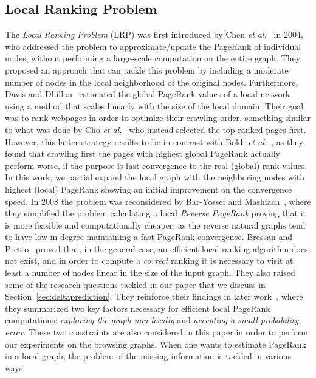 \documentclass{sig-alternate-2013}
\newcommand{\etal}{\emph{et al.}}
\begin{document}
\subsection*{Local Ranking Problem}
The \textit{Local Ranking Problem} (LRP) was first introduced by Chen \etal~\cite{Chen2004} in $2004$, who addressed the problem to approximate/update the PageRank of individual nodes, without performing a large-scale computation on the entire graph.
They proposed an approach that can tackle this problem by including a moderate
number of nodes in the local neighborhood of the original nodes. Furthermore,
Davis and Dhillon~\cite{DavisKDD06} estimated the global PageRank values of a
local network using a method that scales linearly with the size of the local
domain. Their goal was to rank  webpages in order to optimize their crawling
order, something similar to what was done by Cho \etal~\cite{Cho1998} who
instead selected the top-ranked pages first. However, this latter strategy results to be in contrast with Boldi \etal~\cite{BoldiWAW2004}, as they found that crawling first the pages with highest global PageRank actually perform worse, if the purpose is fast convergence to the real (global) rank values. In this work, we partial expand the local graph with the neighboring nodes with highest (local) PageRank showing an initial improvement on the convergence speed.
% 
In $2008$ the problem was reconsidered by Bar-Yossef and Mashiach~\cite{Bar-Yossef2008}, where they simplified the problem calculating a local {\it Reverse PageRank} proving that it is more feasible and computationally cheaper, as the reverse natural graphs tend to have low in-degree maintaining a fast PageRank convergence.
Bressan and Pretto~\cite{Bressan2011} proved that, in the general case, an efficient local ranking algorithm does not exist, and in order to compute a {\it correct} ranking it is necessary to visit at least a number of nodes linear in the size of the input graph. They also raised some of the research questions tackled in our paper that we discuss in Section~\ref{sec:deltaprediction}.
They reinforce their findings in later work~\cite{BressanWWW13}, where they summarized two key factors necessary for efficient local PageRank computations: {\it exploring the graph non-locally} and {\it accepting a small probability error}. These two constraints are also considered in this paper in order to perform our experiments on the browsing graphs. 
When one wants to estimate PageRank in a local graph, the problem of
the missing information is tackled in various ways.
\end{document}
